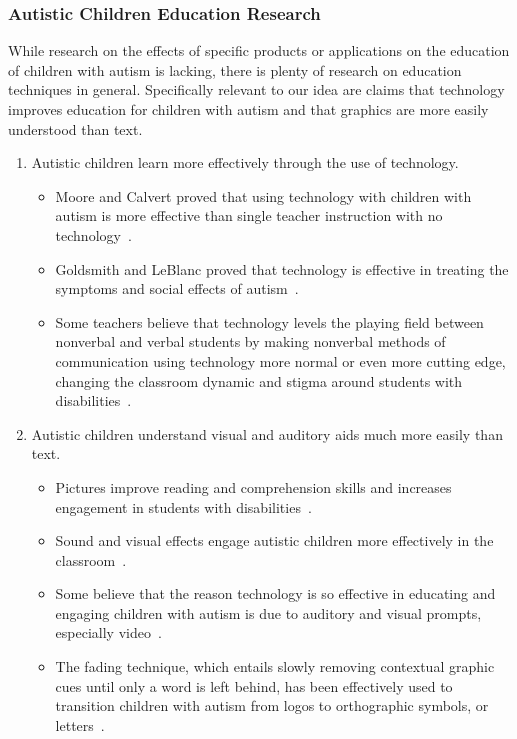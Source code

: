 \subsubsection{Autistic Children Education Research}
While research on the effects of specific products or applications on the education of children with autism is lacking, there is plenty of research on education techniques in general. Specifically relevant to our idea are claims that technology improves education for children with autism and that graphics are more easily understood than text.
\begin{enumerate}\bfseries
\item Autistic children learn more effectively through the use of technology.
\begin{itemize}
\item  \textnormal{Moore and Calvert proved that using technology with children with autism is more effective than single teacher instruction with no technology~\cite{moore}.}
\item  \textnormal{Goldsmith and LeBlanc proved that technology is effective in treating the symptoms and social effects of autism~\cite{goldsmith}.}
\item  \textnormal{Some teachers believe that technology levels the playing field between nonverbal and verbal students by making nonverbal methods of communication using technology more normal or even more cutting edge, changing the classroom dynamic and stigma around students with disabilities~\cite{riechmann}.}
\end{itemize}
\item Autistic children  understand visual and auditory aids much more easily than text.
\begin{itemize}
\item  \textnormal{Pictures improve reading and comprehension skills and increases engagement in students with disabilities~\cite{slater}.}
\item  \textnormal{Sound and visual effects engage autistic children more effectively in the classroom~\cite{moore}.}
\item  \textnormal{Some believe that the reason technology is so effective in educating and engaging children with autism is due to auditory and visual prompts, especially video~\cite{goldsmith}.}
\item  \textnormal{The fading technique, which entails slowly removing contextual graphic cues until only a word is left behind, has been effectively used to transition children with autism from logos to orthographic symbols, or letters~\cite{hetzroni}.}
\end{itemize}
\end{enumerate}

